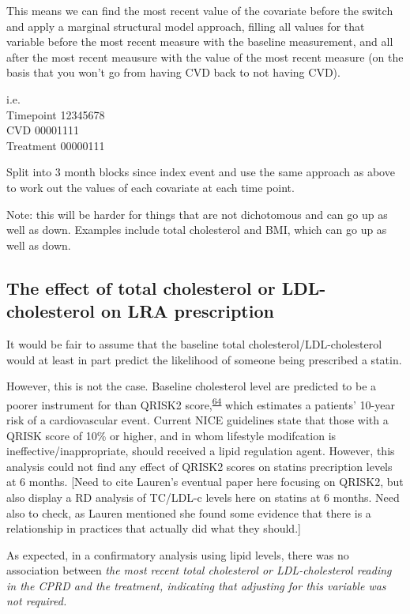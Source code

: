 \documentclass[a4paper, twoside]{templates/ociamthesis}
\begin{document}
This means we can find the most recent value of the covariate before the switch and apply a marginal structural model approach, filling all values for that variable before the most recent measure with the baseline measurement, and all after the most recent meausure with the value of the most recent measure (on the basis that you won't go from having CVD back to not having CVD).

i.e.\\
Timepoint 12345678\\
CVD 00001111\\
Treatment 00000111

Split into 3 month blocks since index event and use the same approach as above to work out the values of each covariate at each time point.

Note: this will be harder for things that are not dichotomous and can go up as well as down. Examples include total cholesterol and BMI, which can go up as well as down.

\hypertarget{the-effect-of-total-cholesterol-or-ldl-cholesterol-on-lra-prescription}{%
\subsection{The effect of total cholesterol or LDL-cholesterol on LRA prescription}\label{the-effect-of-total-cholesterol-or-ldl-cholesterol-on-lra-prescription}}

It would be fair to assume that the baseline total cholesterol/LDL-cholesterol would at least in part predict the likelihood of someone being prescribed a statin.

However, this is not the case. Baseline cholesterol level are predicted to be a poorer instrument for than QRISK2 score,\textsuperscript{\protect\hyperlink{ref-hippisley-cox2008}{64}} which estimates a patients' 10-year risk of a cardiovascular event. Current NICE guidelines state that those with a QRISK score of 10\% or higher, and in whom lifestyle modifcation is ineffective/inappropriate, should received a lipid regulation agent. However, this analysis could not find any effect of QRISK2 scores on statins precription levels at 6 months. {[}Need to cite Lauren's eventual paper here focusing on QRISK2, but also display a RD analysis of TC/LDL-c levels here on statins at 6 months. Need also to check, as Lauren mentioned she found some evidence that there is a relationship in practices that actually did what they should.{]}

As expected, in a confirmatory analysis using lipid levels, there was no association between \emph{the most recent total cholesterol or LDL-cholesterol reading in the CPRD and the treatment, indicating that adjusting for this variable was not required.}
\end{document}
